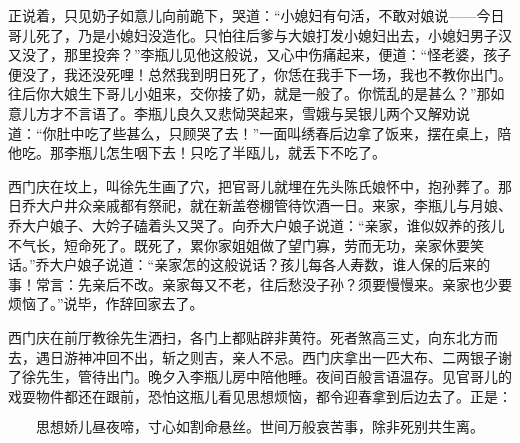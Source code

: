 正说着，只见奶子如意儿向前跪下，哭道：“小媳妇有句活，不敢对娘说——今日哥儿死了，乃是小媳妇没造化。只怕往后爹与大娘打发小媳妇出去，小媳妇男子汉又没了，那里投奔？”李瓶儿见他这般说，又心中伤痛起来，便道：“怪老婆，孩子便没了，我还没死哩！总然我到明日死了，你恁在我手下一场，我也不教你出门。往后你大娘生下哥儿小姐来，交你接了奶，就是一般了。你慌乱的是甚么？”那如意儿方才不言语了。李瓶儿良久又悲恸哭起来，雪娥与吴银儿两个又解劝说道：“你肚中吃了些甚么，只顾哭了去！”一面叫绣春后边拿了饭来，摆在桌上，陪他吃。那李瓶儿怎生咽下去！只吃了半瓯儿，就丢下不吃了。

西门庆在坟上，叫徐先生画了穴，把官哥儿就埋在先头陈氏娘怀中，抱孙葬了。那日乔大户井众亲戚都有祭祀，就在新盖卷棚管待饮酒一日。来家，李瓶儿与月娘、乔大户娘子、大妗子磕着头又哭了。向乔大户娘子说道：“亲家，谁似奴养的孩儿不气长，短命死了。既死了，累你家姐姐做了望门寡，劳而无功，亲家休要笑话。”乔大户娘子说道：“亲家怎的这般说话？孩儿每各人寿数，谁人保的后来的事！常言：先亲后不改。亲家每又不老，往后愁没子孙？须要慢慢来。亲家也少要烦恼了。”说毕，作辞回家去了。

西门庆在前厅教徐先生洒扫，各门上都贴辟非黄符。死者煞高三丈，向东北方而去，遇日游神冲回不出，斩之则吉，亲人不忌。西门庆拿出一匹大布、二两银子谢了徐先生，管待出门。晚夕入李瓶儿房中陪他睡。夜间百般言语温存。见官哥儿的戏耍物件都还在跟前，恐怕这瓶儿看见思想烦恼，都令迎春拿到后边去了。正是：

\[
思想娇儿昼夜啼，寸心如割命悬丝。
世间万般哀苦事，除非死别共生离。
\]
